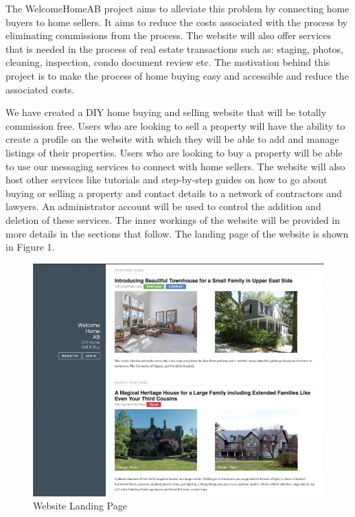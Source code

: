 \documentclass[12pt,a4paper]{report}
\begin{document}
The WelcomeHomeAB project aims to alleviate this problem by connecting home buyers to home sellers. It aims to reduce the costs associated with the process by eliminating commissions from the process. The website will also offer services that is needed in the process of real estate transactions such as: staging, photos, cleaning, inspection, condo document review etc. The motivation behind this project is to make the process of home buying easy and accessible and reduce the associated costs. \par 

We have created a DIY home buying and selling website that will be totally commission free. Users who are looking to sell a property will have the ability to create a profile on the website with which they will be able to add and manage listings of their properties. Users who are looking to buy a property will be able to use our messaging services to connect with home sellers. The website will also host other services like tutorials and step-by-step guides on how to go about buying or selling a property and contact details to a network of contractors and lawyers. An administrator account will be used to control the addition and deletion of these services. The inner workings of the website will be provided in more details in the sections that follow. The landing page of the website is shown in Figure 1.

\begin{figure}[H]
\centering
\includegraphics[scale=0.75]{Landingpage.png}
\caption{Website Landing Page}
\label{Figure:landing-page}
\end{figure}   
\end{document}

